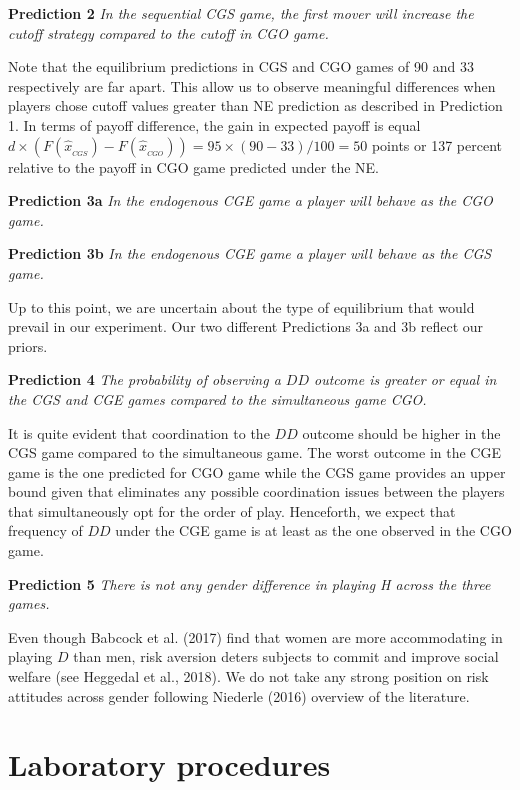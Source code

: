 \documentclass[12pt,english]{article}
\begin{document}
\noindent \textbf{Prediction 2}
\textit{In the sequential CGS game, the first mover will increase the cutoff strategy compared to the cutoff in CGO game. }

Note that the equilibrium predictions in CGS and CGO games of 90 and 33 respectively are far apart. This allow us to observe meaningful differences when players chose cutoff values greater than NE prediction as described in Prediction 1. In terms of payoff difference, the gain in expected payoff is equal $d\times \left( F(\hat{x}_{_{CGS}})-F(\hat{x}_{_{CGO}}) \right)=95\times( 90-33)/100=50$ points or 137 percent relative to the payoff in CGO game predicted under the NE. 


\noindent \textbf{Prediction 3a}
\textit{In the endogenous CGE game a player will behave as the
  CGO game. }


\noindent \textbf{Prediction 3b}
\textit{In the endogenous CGE game a player will behave as the CGS game.}

Up to this point, we are uncertain about the type of equilibrium that would prevail in our experiment. Our two different Predictions 3a and 3b reflect our priors. 


\noindent \textbf{Prediction 4}
\textit{The probability of observing a $DD$ outcome is greater or equal in the CGS and CGE games compared to the simultaneous game CGO.}

It is quite evident that coordination to the $DD$ outcome should be higher in the CGS game compared to the simultaneous game. The worst outcome in the CGE game is the one predicted for CGO game while the CGS game provides an upper bound given that eliminates any possible coordination issues between the players that simultaneously opt for the order of play. Henceforth, we expect that frequency of $DD$ under the CGE game is at least as the one observed in the CGO game. 

\noindent \textbf{Prediction 5}
\textit{There is not any gender difference in playing H across the
  three games.}

Even though Babcock et al. (2017) find that women are more accommodating in playing $D$ than men, risk aversion deters subjects to commit and improve social welfare (see  Heggedal et al., 2018). We do not take any strong position on risk attitudes across gender following Niederle (2016) overview of the literature. 


\section{Laboratory procedures}
\label{sec:game}
\end{document}
